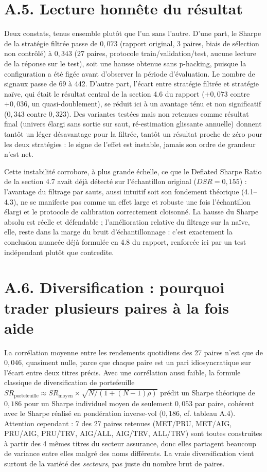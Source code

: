 \documentclass{article}
\begin{document}
\section*{A.5. Lecture honnête du résultat}
Deux constats, tenus ensemble plutôt que l'un sans l'autre. D'une part, le Sharpe de la stratégie filtrée passe de $0{,}073$ (rapport original, 3 paires, biais de sélection non contrôlé) à $0{,}343$ (27 paires, protocole train/validation/test, aucune lecture de la réponse sur le test), soit une hausse obtenue sans p-hacking, puisque la configuration a été figée avant d'observer la période d'évaluation. Le nombre de signaux passe de 69 à 442. D'autre part, l'écart entre stratégie filtrée et stratégie naïve, qui était le résultat central de la section 4.6 du rapport ($+0{,}073$ contre $+0{,}036$, un quasi-doublement), se réduit ici à un avantage ténu et non significatif ($0{,}343$ contre $0{,}323$). Des variantes testées mais non retenues comme résultat final (univers élargi sans sortie sur saut, ré-estimation glissante annuelle) donnent tantôt un léger désavantage pour la filtrée, tantôt un résultat proche de zéro pour les deux stratégies : le signe de l'effet est instable, jamais son ordre de grandeur n'est net.

Cette instabilité corrobore, à plus grande échelle, ce que le Deflated Sharpe Ratio de la section 4.7 avait déjà détecté sur l'échantillon original ($DSR=0{,}155$) : l'avantage du filtrage par sauts, aussi intuitif soit son fondement théorique (4.1--4.3), ne se manifeste pas comme un effet large et robuste une fois l'échantillon élargi et le protocole de calibration correctement cloisonné. La hausse du Sharpe absolu est réelle et défendable ; l'amélioration relative du filtrage sur la naïve, elle, reste dans la marge du bruit d'échantillonnage : c'est exactement la conclusion nuancée déjà formulée en 4.8 du rapport, renforcée ici par un test indépendant plutôt que contredite.

\section*{A.6. Diversification : pourquoi trader plusieurs paires à la fois aide}
La corrélation moyenne entre les rendements quotidiens des 27 paires n'est que de $0{,}046$, quasiment nulle, parce que chaque paire est un pari idiosyncratique sur l'écart entre deux titres précis. Avec une corrélation aussi faible, la formule classique de diversification de portefeuille $SR_{\text{portefeuille}} \approx SR_{\text{moyen}} \times \sqrt{N/(1+(N-1)\bar\rho)}$ prédit un Sharpe théorique de $0{,}186$ pour un Sharpe individuel moyen de seulement $0{,}053$ par paire, cohérent avec le Sharpe réalisé en pondération inverse-vol ($0{,}186$, cf. tableau A.4). Attention cependant : 7 des 27 paires retenues (MET/PRU, MET/AIG, PRU/AIG, PRU/TRV, AIG/ALL, AIG/TRV, ALL/TRV) sont toutes construites à partir des 4 mêmes titres du secteur assurance, donc elles partagent beaucoup de variance entre elles malgré des noms différents. La vraie diversification vient surtout de la variété des \emph{secteurs}, pas juste du nombre brut de paires.
\end{document}
